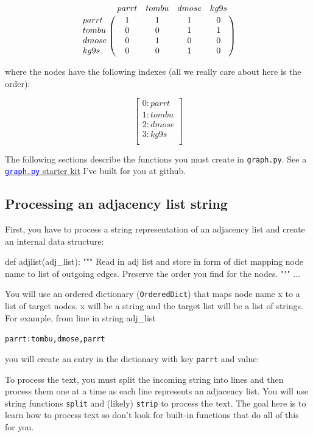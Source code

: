 \begin{fullwidth}
\[
\bordermatrix{
~ & parrt & tombu & dmose & kg9s \cr
parrt & 1 & 1 & 1 & 0\cr
tombu & 0 & 0 & 1 & 1 \cr
dmose & 0 & 1 & 0 & 0 \cr
kg9s & 0 & 0 & 1 & 0\cr
}
\]

\noindent where the nodes have the following indexes (all we really care about here is the order):
 
\[
\left[
\begin{array}{c}
0: parrt \\
1: tombu \\
2: dmose \\
3: kg9s \\
\end{array}
\right]
\]

The following sections describe the functions you must create in {\tt graph.py}. See a \href{https://github.com/parrt/msan501/blob/master/labs/resources/graph.py}{{\textcolor{blue} {\tt graph.py} starter kit}} I've built for you at github.

\subsection{Processing an adjacency list string}

First, you have to process a string representation of an adjacency list and create an internal data structure:

\begin{pyverbatim}
def adjlist(adj_list):
    """
    Read in adj list and store in form of dict mapping node
    name to list of outgoing edges. Preserve the order you find
    for the nodes.
    """
    ...
\end{pyverbatim}

You will use an ordered dictionary ({\tt OrderedDict}) that maps node name x to a list of target nodes. x will be a string and the target list will be a list of strings. For example, from line in string adj\_list

\begin{alltt}
parrt: tombu, dmose, parrt
\end{alltt}

\noindent you will create an entry in the dictionary with key {\tt parrt} and value:

\begin{pyverbatim}
\end{pyverbatim}

\noindent To process the text, you must split the incoming string into lines and then process them one at a time as each line represents an adjacency list. You will use string functions {\tt split} and (likely) {\tt strip} to process the text. The goal here is to learn how to process text so don't look for built-in functions that do all of this for you.


\end{fullwidth}
